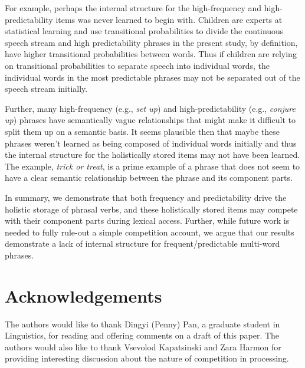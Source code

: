 \documentclass[
  authoryear,
  preprint,
  1p,
  onecolumn]{elsarticle}
\begin{document}
For example, perhaps the internal structure for the high-frequency and
high-predictability items was never learned to begin with. Children are
experts at statistical learning and use transitional probabilities to
divide the continuous speech stream \citep{saffran1996} and high
predictability phrases in the present study, by definition, have higher
transitional probabilities between words. Thus if children are relying
on transitional probabilities to separate speech into individual words,
the individual words in the most predictable phrases may not be
separated out of the speech stream initially.

Further, many high-frequency (e.g., \emph{set up}) and
high-predictability (e.g., \emph{conjure up}) phrases have semantically
vague relationships that might make it difficult to split them up on a
semantic basis. It seems plausible then that maybe these phrases weren't
learned as being composed of individual words initially and thus the
internal structure for the holistically stored items may not have been
learned. The example, \emph{trick or treat}, is a prime example of a
phrase that does not seem to have a clear semantic relationship between
the phrase and its component parts.

In summary, we demonstrate that both frequency and predictability drive
the holistic storage of phrasal verbs, and these holistically stored
items may compete with their component parts during lexical access.
Further, while future work is needed to fully rule-out a simple
competition account, we argue that our results demonstrate a lack of
internal structure for frequent/predictable multi-word phrases.

\section{Acknowledgements}\label{acknowledgements}

The authors would like to thank Dingyi (Penny) Pan, a graduate student
in Linguistics, for reading and offering comments on a draft of this
paper. The authors would also like to thank Vsevolod Kapatsinski and
Zara Harmon for providing interesting discussion about the nature of
competition in processing.

\newpage


  
\end{document}
